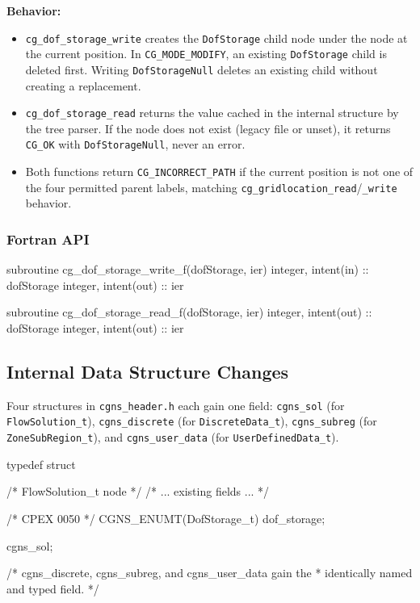\documentclass[11pt,letterpaper]{article}
\makeatletter
\let\cgns@orig@lstlisting\lstlisting
\let\cgns@endorig@lstlisting\endlstlisting
\renewenvironment{lstlisting}
  {\par\needspace{5\baselineskip}\nolinenumbers\cgns@orig@lstlisting}
  {\cgns@endorig@lstlisting\par\linenumbers}
\makeatother
\begin{document}
\textbf{Behavior:}

\begin{itemize}[leftmargin=2em]
\item \texttt{cg\_dof\_storage\_write} creates the
  \texttt{DofStorage} child node under the node at the current
  position.  In \texttt{CG\_MODE\_MODIFY}, an existing
  \texttt{DofStorage} child is deleted first.  Writing
  \texttt{DofStorageNull} deletes an existing child without creating a
  replacement.

\item \texttt{cg\_dof\_storage\_read} returns the value cached in the
  internal structure by the tree parser.  If the node does not exist
  (legacy file or unset), it returns \texttt{CG\_OK} with
  \texttt{DofStorageNull}, never an error.

\item Both functions return \texttt{CG\_INCORRECT\_PATH} if the current
  position is not one of the four permitted parent labels, matching
  \texttt{cg\_gridlocation\_read}/\texttt{\_write} behavior.
\end{itemize}

\subsubsection{Fortran API}

\begin{lstlisting}[language=Fortran]
subroutine cg_dof_storage_write_f(dofStorage, ier)
  integer, intent(in)  :: dofStorage
  integer, intent(out) :: ier

subroutine cg_dof_storage_read_f(dofStorage, ier)
  integer, intent(out) :: dofStorage
  integer, intent(out) :: ier
\end{lstlisting}

\subsection{Internal Data Structure Changes}

Four structures in \texttt{cgns\_header.h} each gain one field:
\texttt{cgns\_sol} (for \texttt{FlowSolution\_t}),
\texttt{cgns\_discrete} (for \texttt{DiscreteData\_t}),
\texttt{cgns\_subreg} (for \texttt{ZoneSubRegion\_t}), and
\texttt{cgns\_user\_data} (for \texttt{UserDefinedData\_t}).

\begin{lstlisting}[language=C]
typedef struct {            /* FlowSolution_t node */
    /* ... existing fields ... */

    /* CPEX 0050 */
    CGNS_ENUMT(DofStorage_t) dof_storage;
} cgns_sol;

/* cgns_discrete, cgns_subreg, and cgns_user_data gain the
 * identically named and typed field. */
\end{lstlisting}
\end{document}
